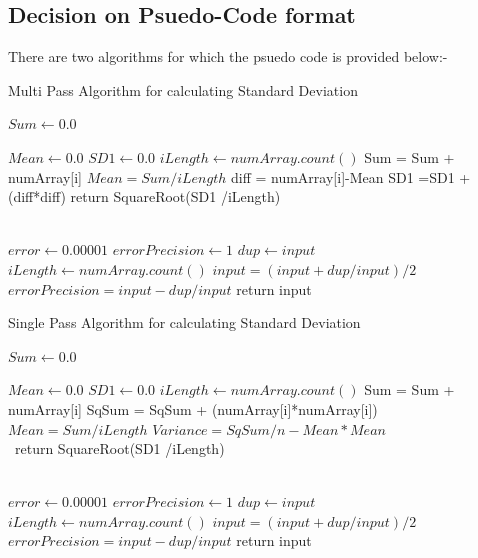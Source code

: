 \documentclass[11pt]{report}
\begin{document}
\subsection{\Large \vspace{0.2 cm}Decision on Psuedo-Code format}
There are two algorithms for which the psuedo code is provided below:-


\begin{algorithm}
\caption{Multi Pass Algorithm for calculating Standard Deviation}

\small
\begin{algorithmic}

\State $Sum \gets 0.0$

\State $Mean \gets 0.0$
\State $SD1 \gets 0.0$
\State $iLength \gets numArray.count()$
    \State Sum = Sum + numArray[i]
\EndFor    
\State $Mean= Sum/iLength$    
    \State diff = numArray[i]-Mean
    \State SD1 =SD1 + (diff*diff)
\EndFor
return SquareRoot(SD1 /iLength)
\EndFunction


\\
\State $error \gets 0.00001$
\State $errorPrecision \gets 1$
\State $dup \gets input$
\State $iLength \gets numArray.count()$
   \State $input = (input+dup/input)/2$
   \State $errorPrecision = input-dup/input$
\EndWhile
return input
\EndFunction
\\

\end{algorithmic}
\end{algorithm}
\pagebreak
\begin{algorithm}
\caption{Single Pass Algorithm for calculating Standard Deviation}


\begin{algorithmic}

\State $Sum \gets 0.0$

\State $Mean \gets 0.0$
\State $SD1 \gets 0.0$
\State $iLength \gets numArray.count()$
    \State Sum = Sum + numArray[i]
    \State SqSum = SqSum + (numArray[i]*numArray[i])
\EndFor    
\State $Mean= Sum/iLength$    
\State $Variance = SqSum/n - Mean*Mean$
\\
\quad\, return SquareRoot(SD1 /iLength)
\EndFunction


\\
\State $error \gets 0.00001$
\State $errorPrecision \gets 1$
\State $dup \gets input$
\State $iLength \gets numArray.count()$
   \State $input = (input+dup/input)/2$
   \State $errorPrecision = input-dup/input$
\EndWhile
return input
\EndFunction
\\

\end{algorithmic}
\end{algorithm}
\end{document}
